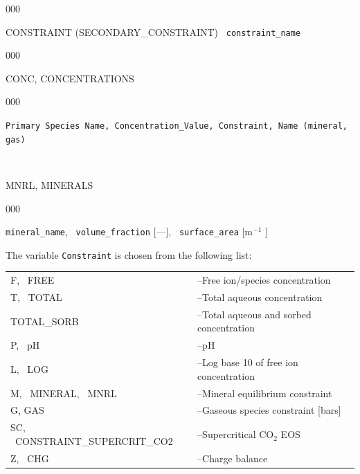 \begin{deflist}{000}
\item [CONSTRAINT (SECONDARY\_CONSTRAINT)] \ {\tt constraint\_name}
\begin{deflist}{000}
\item[CONC, CONCENTRATIONS] ~
\begin{deflist}{000}
\item[{\footnotesize\tt Primary Species Name, Concentration\_Value, Constraint, Name (mineral, gas)}] ~
\end{deflist}
\item[\keyend] ~


\item[MNRL, MINERALS] ~

\begin{deflist}{000}
\item[{\tt mineral\_name}, \ {\tt volume\_fraction} {[---]}, \ {\tt surface\_area} [m$^{-1}$]]
\end{deflist}
\item[\keyend]
\end{deflist}
\item[\keyend]
\end{deflist}


The variable {\tt Constraint} is chosen from the following list:


\begin{tabular}{ll}
F, \ FREE & --Free ion/species concentration\\
T, \ TOTAL & --Total aqueous concentration\\
TOTAL\_SORB & --Total aqueous and sorbed concentration\\
P, \ pH & --pH\\
L, \ LOG & --Log base 10 of free ion concentration\\
M, \ MINERAL, \ MNRL & --Mineral equilibrium constraint\\
G, GAS & --Gaseous species constraint [bars]\\
SC, \ CONSTRAINT\_SUPERCRIT\_CO2 & --Supercritical CO$_2$ EOS\\
Z, \ CHG & --Charge balance
\end{tabular}

